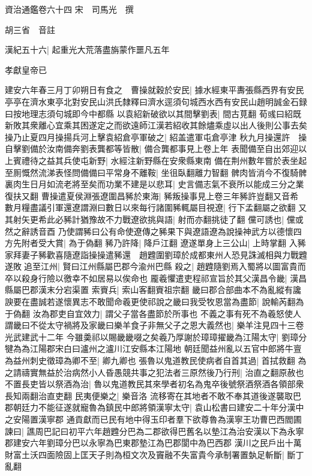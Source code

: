 資治通鑑卷六十四
宋　司馬光　撰

胡三省　音註

漢紀五十六|{
	起重光大荒落盡旃蒙作噩凡五年}


孝獻皇帝已

建安六年春三月丁卯朔日有食之　曹操就穀於安民|{
	據水經東平夀張縣西界有安民亭亭在濟水東亭北對安民山洪氏隸釋曰濟水逕須句城西水西有安民山趙明誠金石録曰按地理志須句城即今中都縣}
以袁紹新破欲以其間擊劉表|{
	間古莧翻}
荀彧曰紹既新敗其衆離心宜乘其困遂定之而欲遠師江漢若紹收其餘燼乘虛以出人後則公事去矣操乃止夏四月操揚兵河上擊袁紹倉亭軍破之|{
	紹盖遣軍屯倉亭津}
秋九月操還許　操自擊劉備於汝南備奔劉表龔都等皆散|{
	備合龔都事見上卷上年}
表聞備至自出郊迎以上賓禮待之益其兵使屯新野|{
	水經注新野縣在安衆縣東南}
備在荆州數年嘗於表坐起至厠慨然流涕表怪問備備曰平常身不離鞍|{
	坐徂臥翻離力智翻}
髀肉皆消今不復騎髀裏肉生日月如流老將至矣而功業不建是以悲耳|{
	史言備志氣不衰所以能成三分之業復扶又翻}
曹操遣夏侯淵張遼圍昌豨於東海|{
	豨叛操事見上卷三年豨許豈翻又音希}
數月糧盡議引軍還遼謂淵曰數日以來每行諸圍豨輒屬目視遼|{
	行下孟翻屬之欲翻}
又其射矢更希此必豨計猶豫故不力戰遼欲挑與語|{
	射而亦翻挑徒了翻}
儻可誘也|{
	儻或然之辭誘音酉}
乃使謂豨曰公有命使遼傳之豨果下與遼語遼為說操神武方以德懷四方先附者受大賞|{
	為于偽翻}
豨乃許降|{
	降戶江翻}
遼遂單身上三公山|{
	上時掌翻}
入豨家拜妻子豨歡喜隨遼詣操操遣豨還　趙韙圍劉璋於成都東州人恐見誅滅相與力戰韙遂敗追至江州|{
	賢曰江州縣屬巴郡今渝州巴縣}
殺之|{
	趙韙隨劉焉入蜀將以圖富貴而卒以殺身行險以徼幸不如居易以俟命也}
龎羲懼遣吏程祁宣旨於其父漢昌令畿|{
	漢昌縣屬巴郡漢末分宕渠置}
索賨兵|{
	索山客翻賨祖宗翻}
畿曰郡合部曲本不為亂縱有讒諛要在盡誠若遂懷異志不敢聞命羲更使祁說之畿曰我受牧恩當為盡節|{
	說輸芮翻為于偽翻}
汝為郡吏自宜效力|{
	謂父子當各盡節於所事也}
不義之事有死不為羲怒使人謂畿曰不從太守禍將及家畿曰樂羊食子非無父子之恩大義然也|{
	樂羊注見四十三卷光武建武十二年}
今雖羮祁以賜畿畿啜之矣羲乃厚謝於璋璋擢畿為江陽太守|{
	劉璋分犍為為江陽郡宋白曰瀘州之瀘川江安縣本江陽地}
朝廷聞益州亂以五官中郎將牛亶為益州刺史徵璋為卿不至|{
	卿九卿也}
張魯以鬼道教民使病者自首其過|{
	首拭救翻}
為之請禱實無益於治病然小人昏愚競共事之犯法者三原然後乃行刑|{
	治直之翻原赦也}
不置長吏皆以祭酒為治|{
	魯以鬼道教民其來學者初名為鬼卒後號祭酒祭酒各領部衆長知兩翻治直吏翻}
民夷便樂之|{
	樂音洛}
流移寄在其地者不敢不奉其道後遂襲取巴郡朝廷力不能征遂就寵魯為鎮民中郎將領漢寧太守|{
	袁山松書曰建安二十年分漢中之安陽置漢寧郡}
通貢獻而已民有地中得玉印者羣下欲尊魯為漢寧王功曹巴西閻圃諫曰|{
	譙周巴記曰初平六年趙韙分巴為二郡欲得巴舊名以墊江為治安漢以下為永寧郡建安六年劉璋分巴以永寧為巴東郡墊江為巴郡閬中為巴西郡}
漢川之民戶出十萬財富土沃四面險固上匡天子則為桓文次及竇融不失富貴今承制署置埶足斬斷|{
	斷丁亂翻}
